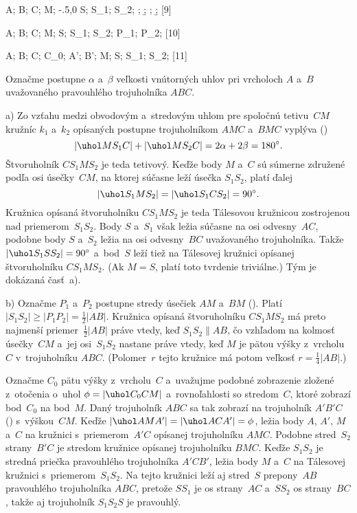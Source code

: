 {%
\fontplace
\tpoint A; \tpoint B; \bpoint C;
\tpoint M; \tpoint\xy-.5,0 S; \rpoint S_1; \lpoint S_2;
\cpoint\a; \cpoint\b;
\a; \b;
[9] \hfil\Obr

\fontplace
\tpoint A; \tpoint B; \bpoint C;
\tpoint M; \tpoint S; \bpoint S_1; \bpoint S_2;
\tpoint P_1; \tpoint P_2;
[10] \hfil\Obr

\fontplace
\tpoint A; \tpoint B; \bpoint C;
\blpoint C_0; \rpoint A'; \lpoint B'; \tpoint M;
\tpoint S; \trpoint S_1; \bpoint S_2;
[11] \hfil\Obr 

Označme postupne $\alpha$ a~$\beta$ veľkosti vnútorných uhlov pri
vrcholoch $A$ a~$B$ uvažovaného pravouhlého trojuholníka $ABC$.

\smallskip
a) Zo vzťahu medzi obvodovým a~stredovým uhlom pre spoločnú tetivu~$CM$
kružníc $k_1$ a~$k_2$ opísaných postupne trojuholníkom $AMC$ a~$BMC$
vyplýva (\obr)
$$
|\uhol MS_1C|+|\uhol MS_2C|=2\alpha+2\beta=180^{\circ}.
$$
Štvoruholník $CS_1MS_2$ je teda tetivový. Keďže body
$M$ a~$C$ sú súmerne združené podľa osi úsečky~$CM$, na ktorej
súčasne leží úsečka $S_1S_2$, platí ďalej
$$
|\uhol S_1MS_2|=|\uhol S_1CS_2|=90^{\circ}.
$$
Kružnica opísaná štvoruholníku $CS_1MS_2$ je teda Tálesovou
kružnicou zostrojenou nad priemerom~$S_1S_2$. Body $S$ a~$S_1$
však ležia súčasne na osi odvesny~$AC$, podobne body $S$
a~$S_2$ ležia na osi odvesny~$BC$ uvažovaného trojuholníka. Takže
$|\uhol S_1SS_2|=90^{\circ}$ a~bod~$S$ leží tiež
na Tálesovej kružnici opísanej štvoruholníku $CS_1MS_2$. (Ak
$M=S$, platí toto tvrdenie triviálne.) Tým je dokázaná časť~a).

\inspicture{}

\smallskip
b) Označme $P_1$ a~$P_2$ postupne stredy úsečiek $AM$ a~$BM$ (\obr).
Platí $|S_1S_2|\ge |P_1P_2|=\frac12|AB|$. Kružnica opísaná
\inspicture{}
štvoruholníku $CS_1MS_2$ má preto najmenší priemer~$\frac12|AB|$
práve vtedy, keď $S_1S_2\parallel AB$, čo vzhľadom na kolmosť úsečky~$CM$
a~jej osi~$S_1S_2$ nastane práve vtedy, keď $M$ je pätou výšky
z~vrcholu~$C$ v~trojuholníku $ABC$. (Polomer~$r$ tejto kružnice má
potom veľkosť $r=\frac14|AB|$.)

\ineriesenie
Označme $C_0$ pätu výšky z~vrcholu~$C$ a~uvažujme podobné
zobrazenie zložené z~otočenia o~uhol $\phi=|\uhol C_0CM|$
a~rovnoľahlosti so stredom~$C$, ktoré zobrazí bod~$C_0$ na bod~$M$.
Daný trojuholník $ABC$ sa tak zobrazí na trojuholník $A'B'C$ (\obr) s~výškou~$CM$.
\inspicture{}
Keďže $|\uhol AMA'|=|\uhol ACA'|=\phi$, ležia body $A$, $A'$,
$M$ a~$C$ na kružnici s~priemerom~$A'C$ opísanej trojuholníku $AMC$.
Podobne stred~$S_2$ strany~$B'C$ je stredom kružnice opísanej trojuholníku
$BMC$. Keďže $S_1S_2$ je stredná priečka pravouhlého
trojuholníka $A'CB'$, ležia body $M$ a~$C$ na Tálesovej kružnici
s~priemerom~$S_1S_2$. Na tejto kružnici leží aj stred~$S$ prepony~$AB$
pravouhlého trojuholníka $ABC$, pretože $SS_1$ je os strany~$AC$
a~$SS_2$ os strany~$BC$, takže aj trojuholník $S_1S_2S$ je pravouhlý.

}
